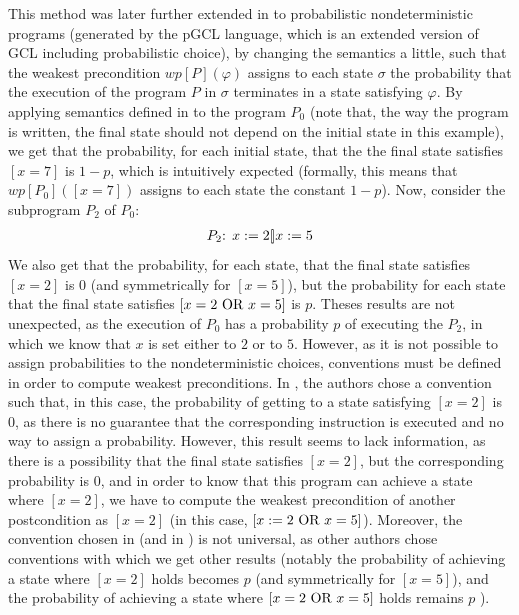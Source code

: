 \documentclass[a4paper,10pt]{llncs}
\begin{document}
This method was later further extended in \cite{McIver05} to probabilistic nondeterministic programs (generated by the pGCL language, which is an extended version of GCL including probabilistic choice), by changing the semantics a little, such that the weakest precondition $wp[P](\varphi)$ assigns to each state $\sigma$ the probability that the execution of the program $P$ in $\sigma$ terminates in a state satisfying $\varphi$. By applying semantics defined in \cite{McIver05} to the program $P_0$ (note that, the way the program is written, the final state should not depend on the initial state in this example), we get that the probability, for each initial state, that the the final state satisfies $[x = 7]$ is $1-p$, which is intuitively expected (formally, this means that $wp[P_0]([x = 7])$ assigns to each state the constant $1-p$). Now, consider the subprogram $P_2$ of $P_0$:
\begin{align*}
 P_2\textnormal{: } x := 2 [\!] x := 5 
\end{align*}
We also get that the probability, for each state, that the final state satisfies $[x = 2]$ is $0$ (and symmetrically for $[x = 5]$), but the probability for each state that the final state satisfies $[x = 2 \textnormal{ OR } x = 5]$ is $p$. Theses results are not unexpected, as the execution of $P_0$ has a probability $p$ of executing the $P_2$, in which we know that $x$ is set  either to $2$ or to $5$. However, as it is not possible to assign probabilities to the nondeterministic choices, conventions must be defined in order to compute weakest preconditions. In \cite{McIver05}, the authors chose a convention such that, in this case, the probability of getting to a state satisfying $[x = 2]$ is $0$, as there is no guarantee that the corresponding instruction is executed and no way to assign a probability.\newline
However, this result seems to lack information, as there is a possibility that the final state satisfies $[x = 2]$, but the corresponding probability is $0$, and in order to know that this program can achieve a state where $[x = 2]$, we have to compute the weakest precondition of another postcondition as $[x = 2]$ (in this case, $[x := 2 \textnormal{ OR } x = 5]$).\newline
Moreover, the convention chosen in \cite{McIver05} (and in \cite{WuChen11}) is not universal, as other authors \cite{WuChen08,WuChen12} chose conventions with which we get other results (notably the probability of achieving a state where $[x = 2]$ holds becomes $p$ (and symmetrically for $[x = 5]$), and the probability of achieving a state where $[x = 2 \textnormal{ OR } x = 5]$ holds remains $p$ ). \bigskip
\end{document}
